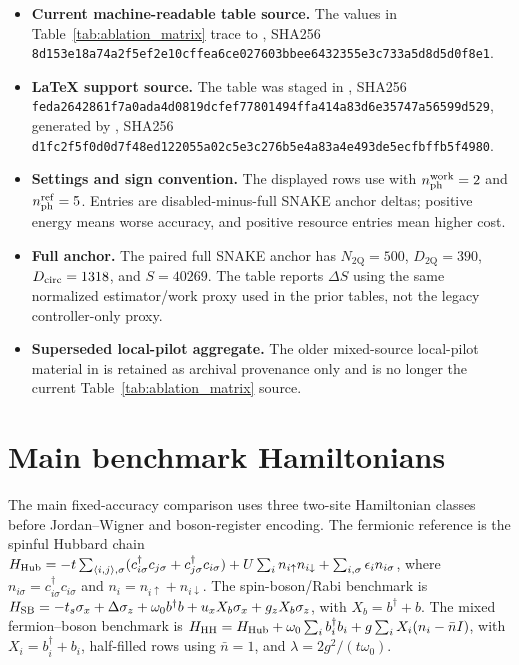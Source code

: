 \documentclass[
  reprint,
  amsmath,
  amssymb,
  aps,
  pra,
  nofootinbib,
  superscriptaddress,
  floatfix
]{revtex4-2}
\newcommand{\hh}{\mathrm{HH}}
\newcommand{\twq}{\mathrm{2Q}}
\begin{document}
\begin{itemize}
\item \textbf{Current machine-readable table source.} The values in Table~\ref{tab:ablation_matrix} trace to , SHA256 \texttt{8d153e18a74a2f5ef2e10cffea6ce027603bbee6432355e3c733a5d8d5d0f8e1}.
\item \textbf{LaTeX support source.} The table was staged in , SHA256 \texttt{feda2642861f7a0ada4d0819dcfef77801494ffa414a83d6e35747a56599d529}, generated by , SHA256 \texttt{d1fc2f5f0d0d7f48ed122055a02c5e3c276b5e4a83a4e493de5ecfbffb5f4980}.
\item \textbf{Settings and sign convention.} The displayed rows use  with $n_{\rm ph}^{\rm work}=2$ and $n_{\rm ph}^{\rm ref}=5$. Entries are disabled-minus-full SNAKE anchor deltas; positive energy means worse accuracy, and positive resource entries mean higher cost.
\item \textbf{Full anchor.} The paired full SNAKE anchor has $N_{\twq}=500$, $D_{\twq}=390$, $D_{\rm circ}=1318$, and $S=40269$. The table reports $\Delta S$ using the same normalized estimator/work proxy used in the prior tables, not the legacy controller-only proxy.
\item \textbf{Superseded local-pilot aggregate.} The older mixed-source local-pilot material in  is retained as archival provenance only and is no longer the current Table~\ref{tab:ablation_matrix} source.
\end{itemize}

\fi







\section{Main benchmark Hamiltonians}
\label{app:hamiltonian_families}

The main fixed-accuracy comparison uses three two-site Hamiltonian classes
before Jordan--Wigner and boson-register encoding.  The fermionic reference is
the spinful Hubbard chain
\(H_{\rm Hub}=-t\sum_{\langle i,j\rangle,\sigma}
(c_{i\sigma}^{\dagger}c_{j\sigma}+c_{j\sigma}^{\dagger}c_{i\sigma})
+U\sum_i n_{i\uparrow}n_{i\downarrow}
+\sum_{i,\sigma}\epsilon_i n_{i\sigma}\), where
\(n_{i\sigma}=c_{i\sigma}^{\dagger}c_{i\sigma}\) and
\(n_i=n_{i\uparrow}+n_{i\downarrow}\).  The spin-boson/Rabi benchmark is
\(H_{\rm SB}=-t_s\sigma_x+\Delta\sigma_z+\omega_0 b^\dagger b
+u_xX_b\sigma_x+g_zX_b\sigma_z\), with \(X_b=b^\dagger+b\).  The mixed
fermion--boson benchmark is
\(H_{\hh}=H_{\rm Hub}+\omega_0\sum_i b_i^\dagger b_i
+g\sum_iX_i(n_i-\bar n I)\), with \(X_i=b_i^\dagger+b_i\), half-filled
rows using \(\bar n=1\), and \(\lambda=2g^2/(t\omega_0)\).
\end{document}
